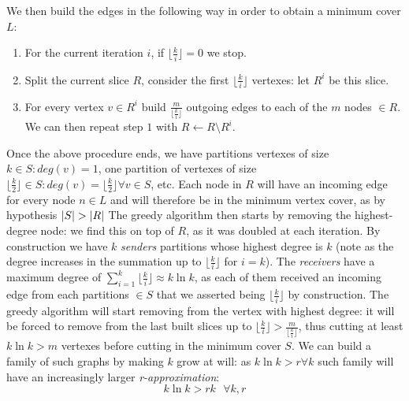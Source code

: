 We then build the edges in the following way in order to obtain a minimum cover $L$:
	\begin{enumerate}
	\item For the current iteration $i$, if $\lfloor{\frac{k}{i}}\rfloor = 0$ we stop.
	\item Split the current slice $R$, consider the first $\lfloor{\frac{k}{i}}\rfloor$ vertexes: let $R^i$ be this slice.
	\item For every vertex $v \in R^i$ build $\frac{m}{\lfloor{\frac{k}{i}}\rfloor}$ outgoing edges to each of the $m$ nodes $\in R$.
	We can then repeat step $1$ with $R \gets R \setminus R^i$.
	\end{enumerate}
Once the above procedure ends, we have partitions vertexes of size $k \in S: deg(v) = 1$, one partition of vertexes of size $\lfloor{\frac{k}{2}}\rfloor \in S: deg(v) = \lfloor{\frac{k}{2}}\rfloor \forall v \in S$, etc. 
Each node in $R$ will have an incoming edge for every node $n \in L$ and will therefore be in the minimum vertex cover, as by hypothesis $\lvert S\rvert > \lvert R\rvert$
The greedy algorithm then starts by removing the highest-degree node: we find this on top of $R$, as it was doubled at each iteration.
By construction we have $k$ \emph{senders} partitions whose highest degree is $k$ (note as the degree increases in the summation up to $\lfloor{\frac{k}{i}}\rfloor$ for $i = k$).
The \emph{receivers} have a maximum degree of $\sum_{i = 1}^{k} \lfloor{\frac{k}{i}}\rfloor \approx k \ln k$,
as each of them received an incoming edge from each partitions $\in S$ that we asserted being $\lfloor{\frac{k}{i}}\rfloor$ by construction.
The greedy algorithm will start removing from the vertex with highest degree: it will be forced to remove from the last built slices up to $\lfloor{\frac{k}{i}}\rfloor > \frac{m}{\lfloor{\frac{k}{i}}\rfloor}$, thus cutting at least $k \ln k > m$ vertexes before cutting in the minimum cover $S$.
We can build a family of such graphs by making $k$ grow at will: as $k \ln k > r \forall k$ such family will have an increasingly larger \emph{r-approximation}:
\begin{equation*}
  k \ln k > rk \text{ }\forall k, r
\end{equation*}